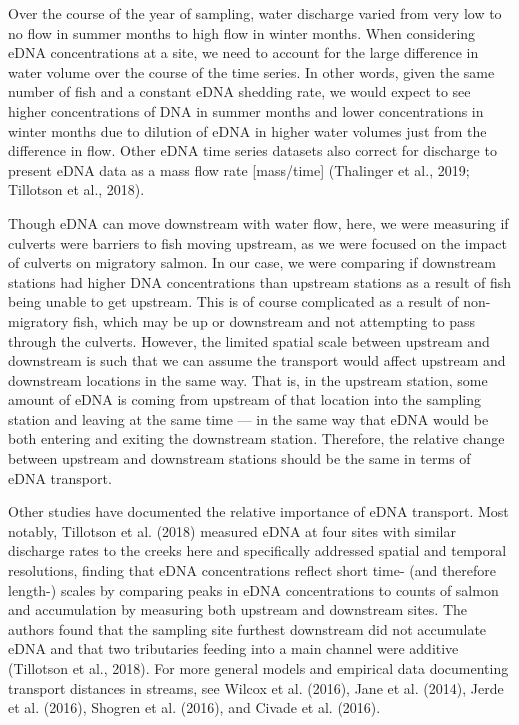 \documentclass[
]{article}
\begin{document}
Over the course of the year of sampling, water discharge varied from
very low to no flow in summer months to high flow in winter months. When
considering eDNA concentrations at a site, we need to account for the
large difference in water volume over the course of the time series. In
other words, given the same number of fish and a constant eDNA shedding
rate, we would expect to see higher concentrations of DNA in summer
months and lower concentrations in winter months due to dilution of eDNA
in higher water volumes just from the difference in flow. Other eDNA
time series datasets also correct for discharge to present eDNA data as
a mass flow rate {[}mass/time{]} (Thalinger et al., 2019; Tillotson et
al., 2018).

Though eDNA can move downstream with water flow, here, we were measuring
if culverts were barriers to fish moving upstream, as we were focused on
the impact of culverts on migratory salmon. In our case, we were
comparing if downstream stations had higher DNA concentrations than
upstream stations as a result of fish being unable to get upstream. This
is of course complicated as a result of non-migratory fish, which may be
up or downstream and not attempting to pass through the culverts.
However, the limited spatial scale between upstream and downstream is
such that we can assume the transport would affect upstream and
downstream locations in the same way. That is, in the upstream station,
some amount of eDNA is coming from upstream of that location into the
sampling station and leaving at the same time --- in the same way that
eDNA would be both entering and exiting the downstream station.
Therefore, the relative change between upstream and downstream stations
should be the same in terms of eDNA transport.

Other studies have documented the relative importance of eDNA transport.
Most notably, Tillotson et al. (2018) measured eDNA at four sites with
similar discharge rates to the creeks here and specifically addressed
spatial and temporal resolutions, finding that eDNA concentrations
reflect short time- (and therefore length-) scales by comparing peaks in
eDNA concentrations to counts of salmon and accumulation by measuring
both upstream and downstream sites. The authors found that the sampling
site furthest downstream did not accumulate eDNA and that two
tributaries feeding into a main channel were additive (Tillotson et al.,
2018). For more general models and empirical data documenting transport
distances in streams, see Wilcox et al. (2016), Jane et al. (2014),
Jerde et al. (2016), Shogren et al. (2016), and Civade et al. (2016).
\end{document}
